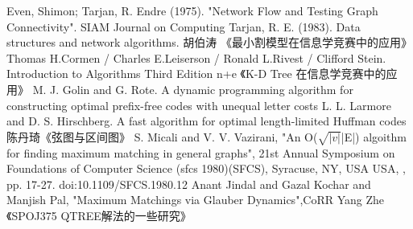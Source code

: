 \begin{thebibliography}{999}
	 Even, Shimon; Tarjan, R. Endre (1975).
	"Network Flow and Testing Graph Connectivity".
    SIAM Journal on Computing
     Tarjan, R. E. (1983).
    Data structures and network algorithms.
    胡伯涛 《最小割模型在信息学竞赛中的应用》
      Thomas H.Cormen / Charles E.Leiserson /
     Ronald L.Rivest / Clifford Stein.
     Introduction to Algorithms Third Edition
    n+e 《K-D Tree 在信息学竞赛中的应用》
    M. J. Golin and G. Rote.
    A dynamic programming algorithm for constructing optimal
    prefix-free codes with unequal letter costs
    L. L. Larmore and D. S. Hirschberg.
    A fast algorithm for optimal length-limited Huffman codes
     陈丹琦《弦图与区间图》
    S. Micali and V. V. Vazirani,
    "An O($\sqrt{|v|}$|E|) algoithm for finding maximum matching
    in general graphs",
     21st Annual Symposium on Foundations of Computer Science (sfcs 1980)(SFCS),
     Syracuse, NY, USA USA, , pp. 17-27.
    doi:10.1109/SFCS.1980.12
     Anant Jindal and Gazal Kochar and Manjish Pal,
    "Maximum Matchings via Glauber Dynamics",CoRR
     Yang Zhe 《SPOJ375 QTREE解法的一些研究》
\end{thebibliography}
